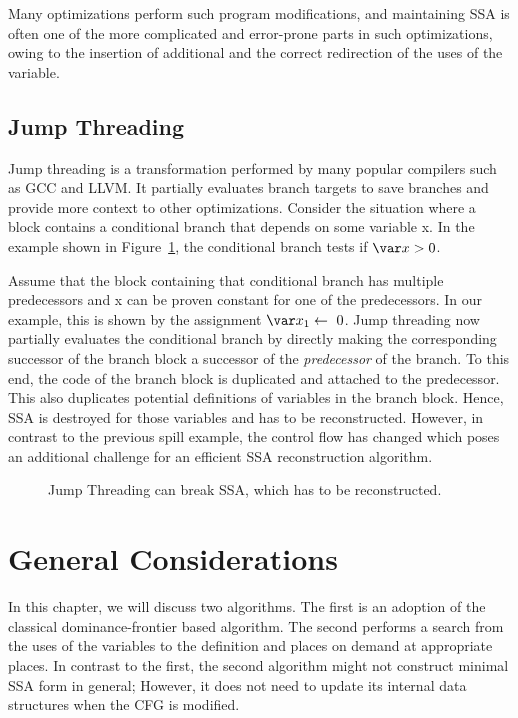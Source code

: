 {Many optimizations perform such program modifications, and
maintaining SSA is often one of the more complicated and error-prone parts in
such optimizations, owing to the insertion of additional \phifuns and the
correct redirection of the uses of the variable.

\subsection{Jump Threading}

Jump threading is a transformation performed by many popular compilers such as GCC and LLVM.
It partially evaluates branch targets to save branches and provide more context to other optimizations.
Consider the situation where
a block contains a conditional branch that depends on some variable \var x.
In the example shown in Figure~\ref{fig:threading}, the conditional branch tests if $\var x> 0$.

Assume that the block containing that conditional branch has multiple predecessors and \var x can be proven constant for one of the predecessors.
In our example, this is shown by the assignment $\var x_1\gets~0$.
Jump threading now partially evaluates the conditional branch by directly making the corresponding successor of the branch block a successor of the \emph{predecessor} of the branch.
To this end, the code of the branch block is duplicated and attached to the predecessor.
This also duplicates potential definitions of variables in the branch block.
Hence, SSA is destroyed for those variables and has to be reconstructed.
However, in contrast to the previous spill example, the control flow has
changed which poses an additional challenge for an efficient SSA reconstruction
algorithm.

\begin{figure}[htbp]
  \begin{center}
    \hfill
    \hfill
  \end{center}
  \caption{Jump Threading can break SSA, which has to be reconstructed.}
  \label{fig:threading}
\end{figure}


\section{General Considerations}
In this chapter, we will discuss two algorithms.
The first is an adoption of the classical dominance-frontier based algorithm.
The second performs a search from the uses of the variables to the definition and places \phifuns on demand at appropriate places.
In contrast to the first, the second algorithm might not construct minimal SSA
form in general;
However, it does not need to update its internal data structures when the CFG is modified.

}
